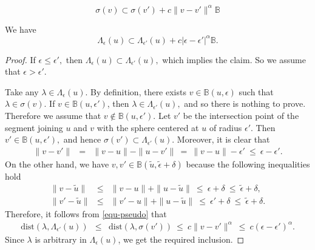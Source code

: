 \documentclass[10pt,a4paper]{amsart}
\begin{document}
\begin{equation} \label{equ-pseudo}
 \sigma(v) \subset  \sigma({v'}) + c \|v-{v'}\|^\alpha \mathbb{B}
 \end{equation}

\begin{claim} \label{claim1}
We have
$$\Lambda_{\epsilon}(u)  \subset \Lambda_{\epsilon'}(u) + c  |\epsilon-\epsilon'|^\alpha \mathbb{B}.$$
\end{claim}

\begin{proof}
If $\epsilon \leq \epsilon',$ then $\Lambda_\epsilon(u) \subset \Lambda_{\epsilon'}(u),$ which implies the claim. So we assume that $\epsilon >  \epsilon'.$

Take any $\lambda \in \Lambda_\epsilon({u}).$ By definition, there exists $v \in \mathbb B({u}, \epsilon)$ such that $\lambda \in \sigma(v).$  If $v\in \mathbb B(u, \epsilon')$, then $\lambda \in \Lambda_{\epsilon'}(u),$ and so there is nothing to prove. Therefore we assume that $v \not \in \mathbb B(u, \epsilon')$.  Let  $v'$ be the intersection point of the segment joining $u$ and $v$ with the sphere centered at $u$ of radius $\epsilon'.$ Then $v' \in \mathbb B({u}, \epsilon'),$ and hence $\sigma(v')\subset \Lambda_{\epsilon'}({u}).$  Moreover, it is clear that
\begin{eqnarray*}
\|v- v'\| & = & \|v - u\| - \|u - v'\| \ = \ \|v - u\| - \epsilon' \ \leq \ \epsilon - \epsilon'.
\end{eqnarray*}
On the other hand, we have $v, v'\in \mathbb B(\tilde{u}, \tilde{\epsilon} + \delta)$ because the following inequalities hold
\begin{eqnarray*}
\|v - \tilde{u}\| & \leq & \|v - u\| + \|u - \tilde{u}\| \ \leq \ \epsilon + \delta \ \le \ \tilde{\epsilon} + \delta, \\
\|v' - \tilde{u}\| & \leq & \|v' - u\| + \|u - \tilde{u}\| \ \leq \ \epsilon' + \delta \ \le \ \tilde{\epsilon} + \delta.
\end{eqnarray*}
Therefore, it follows from  \eqref{equ-pseudo} that
\begin{eqnarray*}
\mbox{dist}(\lambda, \Lambda_{\epsilon'}({u})) & \leq & \mbox{dist}(\lambda, \sigma(v')) \ \leq \ c \|v - v'\|^\alpha \ \leq \ c (\epsilon - \epsilon')^\alpha.
\end{eqnarray*}
Since $\lambda$ is arbitrary in $\Lambda_\epsilon({u})$, we get the required inclusion.
\end{proof}
\end{document}
